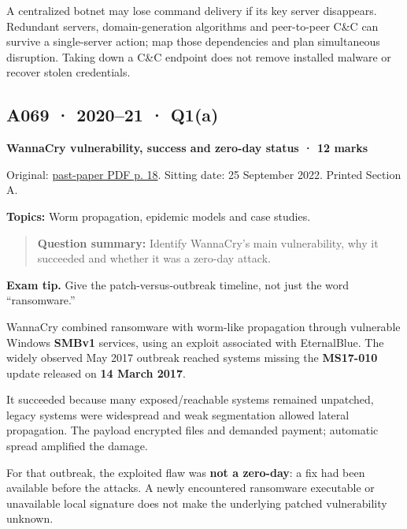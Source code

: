 \documentclass[11pt,a4paper]{article}
\begin{document}
A centralized botnet may lose command delivery if its key server disappears. Redundant servers,\allowbreak{} domain-generation algorithms and peer-to-peer C\&C can survive a single-server action; map those dependencies and plan simultaneous disruption. Taking down a C\&C endpoint does not remove installed malware or recover stolen credentials.




\clearpage
\subsection{A069 · 2020–21 · Q1(a)}\label{a069}

\textbf{WannaCry vulnerability,\allowbreak{} success and zero-day status · 12 marks}


Original: \href{../../CSE405-Security_Merged.pdf\#page=18}{past-paper PDF p. 18}. Sitting date: 25 September 2022. Printed Section A.


\textbf{Topics:} Worm propagation,\allowbreak{} epidemic models and case studies.



\begin{quote}\small

\textbf{Question summary:} Identify WannaCry’s main vulnerability,\allowbreak{} why it succeeded and whether it was a zero-day attack.



\end{quote}


{\color{ForestGreen}\textbf{Exam tip.} Give the patch-versus-outbreak timeline,\allowbreak{} not just the word “ransomware.”}


WannaCry combined ransomware with worm-like propagation through vulnerable Windows \textbf{SMBv1} services,\allowbreak{} using an exploit associated with EternalBlue. The widely observed May 2017 outbreak reached systems missing the \textbf{MS17-010} update released on \textbf{14 March 2017}.


It succeeded because many exposed/\allowbreak{}reachable systems remained unpatched,\allowbreak{} legacy systems were widespread and weak segmentation allowed lateral propagation. The payload encrypted files and demanded payment; automatic spread amplified the damage.


For that outbreak,\allowbreak{} the exploited flaw was \textbf{not a zero-day}: a fix had been available before the attacks. A newly encountered ransomware executable or unavailable local signature does not make the underlying patched vulnerability unknown.
\end{document}
